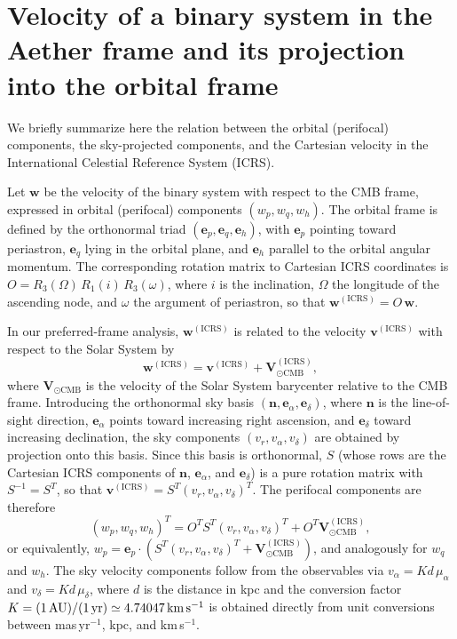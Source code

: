 \documentclass[
    floats,
    floatfix,
    amssymb,
    prd,
    twocolumn,
    superscriptaddress,
    nofootinbib,
    unicode,
    colorlinks=true,
    linktocpage=true
]{revtex4-2}
\begin{document}
\section{Velocity of a binary system in the Aether frame and its projection into the orbital frame}
\label{app:vel_transf}

We briefly summarize here the relation between the orbital (perifocal) components, 
the sky-projected components, and the Cartesian velocity in the International 
Celestial Reference System (ICRS).

Let $\mathbf{w}$ be the velocity of the binary system with respect to the CMB frame,
expressed in orbital (perifocal) components $(w_p, w_q, w_h)$. The orbital frame is 
defined by the orthonormal triad $(\mathbf{e}_p, \mathbf{e}_q, \mathbf{e}_h)$, with 
$\mathbf{e}_p$ pointing toward periastron, $\mathbf{e}_q$ lying in the orbital plane, 
and $\mathbf{e}_h$ parallel to the orbital angular momentum. The corresponding 
rotation matrix to Cartesian ICRS coordinates is $O = R_3(\Omega)\,R_1(i)\,R_3(\omega)$, 
where $i$ is the inclination, $\Omega$ the longitude of the ascending node, and 
$\omega$ the argument of periastron, so that $\mathbf{w}^{(\mathrm{ICRS})} = O\,\mathbf{w}$.

In our preferred-frame analysis, $\mathbf{w}^{(\mathrm{ICRS})}$ is related to the 
velocity $\mathbf{v}^{(\mathrm{ICRS})}$ with respect to the Solar System by
\[
\mathbf{w}^{(\mathrm{ICRS})} = \mathbf{v}^{(\mathrm{ICRS})} + \mathbf{V}_{\odot\mathrm{CMB}}^{(\mathrm{ICRS})},
\]
where $\mathbf{V}_{\odot\mathrm{CMB}}$ is the velocity of the Solar System barycenter 
relative to the CMB frame. Introducing the orthonormal sky basis $(\mathbf{n}, \mathbf{e}_\alpha, \mathbf{e}_\delta)$, 
where $\mathbf{n}$ is the line-of-sight direction, $\mathbf{e}_\alpha$ points toward 
increasing right ascension, and $\mathbf{e}_\delta$ toward increasing declination, 
the sky components $(v_r, v_\alpha, v_\delta)$ are obtained by projection onto this 
basis. Since this basis is orthonormal, $S$ (whose rows are the Cartesian ICRS 
components of $\mathbf{n}$, $\mathbf{e}_\alpha$, and $\mathbf{e}_\delta$) is a pure 
rotation matrix with $S^{-1} = S^T$, so that 
$\mathbf{v}^{(\mathrm{ICRS})} = S^T(v_r, v_\alpha, v_\delta)^T$. The perifocal 
components are therefore
\[
(w_p, w_q, w_h)^T = O^T S^T (v_r, v_\alpha, v_\delta)^T + O^T \mathbf{V}_{\odot\mathrm{CMB}}^{(\mathrm{ICRS})},
\]
or equivalently, $w_p = \mathbf{e}_p \cdot (S^T(v_r, v_\alpha, v_\delta)^T + 
\mathbf{V}_{\odot\mathrm{CMB}}^{(\mathrm{ICRS})})$, and analogously for $w_q$ and $w_h$. The sky velocity components follow from the observables via $v_\alpha = K d\,\mu_\alpha$ 
and $v_\delta = K d\,\mu_\delta$, where $d$ is the distance in kpc and the conversion 
factor $K = (1\,{\rm AU})/(1\,{\rm yr}) \simeq 4.74047\,{\rm km\,s^{-1}}$ is obtained 
directly from unit conversions between mas\,yr$^{-1}$, kpc, and km\,s$^{-1}$.





\end{document}
